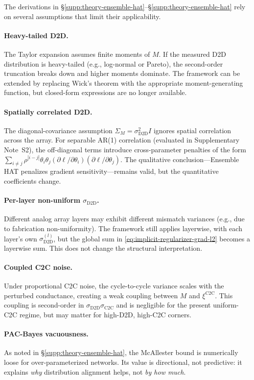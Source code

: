 The derivations in \S\ref{supp:theory-ensemble-hat}--\S\ref{supp:theory-ensemble-hat} rely on several assumptions that limit their applicability.

\paragraph{Heavy-tailed D2D.} The Taylor expansion assumes finite moments of $M$. If the measured D2D distribution is heavy-tailed (e.g., log-normal or Pareto), the second-order truncation breaks down and higher moments dominate. The framework can be extended by replacing Wick's theorem with the appropriate moment-generating function, but closed-form expressions are no longer available.

\paragraph{Spatially correlated D2D.} The diagonal-covariance assumption $\Sigma_M=\sigma_{\text{D2D}}^2 I$ ignores spatial correlation across the array. For separable AR(1) correlation (evaluated in Supplementary Note~S2), the off-diagonal terms introduce cross-parameter penalties of the form $\sum_{i\neq j}\rho^{|i-j|}\theta_i\theta_j(\partial\ell/\partial\theta_i)(\partial\ell/\partial\theta_j)$. The qualitative conclusion---Ensemble HAT penalizes gradient sensitivity---remains valid, but the quantitative coefficients change.

\paragraph{Per-layer non-uniform $\sigma_{\text{D2D}}$.} Different analog array layers may exhibit different mismatch variances (e.g., due to fabrication non-uniformity). The framework still applies layerwise, with each layer's own $\sigma_{\text{D2D}}^{(l)}$, but the global sum in \eqref{eq:implicit-regularizer-grad-l2} becomes a layerwise sum. This does not change the structural interpretation.

\paragraph{Coupled C2C noise.} Under proportional C2C noise, the cycle-to-cycle variance scales with the perturbed conductance, creating a weak coupling between $M$ and $\xi^{\text{C2C}}$. This coupling is second-order in $\sigma_{\text{D2D}}\sigma_{\text{C2C}}$ and is negligible for the present uniform-C2C regime, but may matter for high-D2D, high-C2C corners.

\paragraph{PAC-Bayes vacuousness.} As noted in \S\ref{supp:theory-ensemble-hat}, the McAllester bound is numerically loose for over-parameterized networks. Its value is directional, not predictive: it explains \emph{why} distribution alignment helps, not \emph{by how much}.
